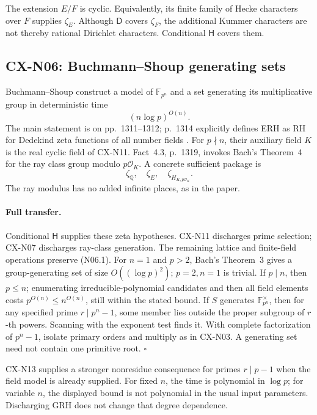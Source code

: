 The extension \(E/F\) is cyclic. Equivalently, its finite family of
Hecke characters over \(F\) supplies \(\zeta_E\). Although \(\mathsf D\)
covers \(\zeta_F\), the additional Kummer characters are not thereby
rational Dirichlet characters. Conditional \(\mathsf H\) covers them.

\subsection{CX-N06: Buchmann--Shoup generating sets}
\label{cx-n06}

Buchmann--Shoup construct a model of \(\mathbb F_{p^n}\) and a set
generating its multiplicative group in deterministic time
\[
                              (n\log p)^{O(n)}.                \tag{N06.1}
\]
The main statement is on pp.~1311--1312; p.~1314 explicitly defines
ERH as RH for Dedekind zeta functions of all number fields
\cite{CXNBuchmannShoup96}.
For \(p\nmid n\), their auxiliary field \(K\) is the real cyclic field of
CX-N11. Fact~4.3, p.~1319, invokes Bach's Theorem~4 for the ray class
group modulo \(p\mathcal O_K\). A concrete sufficient package is
\[
                   \zeta_{\mathbb Q},\quad\zeta_E,\quad
                   \zeta_{H_{K,p\mathcal O_K}} .
\]
The ray modulus has no added infinite places, as in the paper.

\paragraph{Full transfer.}
Conditional \(\mathsf H\) supplies these zeta hypotheses. CX-N11
discharges prime selection; CX-N07 discharges ray-class generation.
The remaining lattice and finite-field operations preserve (N06.1).
For \(n=1\) and \(p>2\), Bach's Theorem~3 gives a group-generating set of size \(O((\log p)^2)\); \(p=2,n=1\) is trivial. If \(p\mid n\), then \(p\leq n\); enumerating irreducible-polynomial candidates and then all field elements costs \(p^{O(n)}\leq n^{O(n)}\), still within the stated bound. If \(S\) generates \(\mathbb F_{p^n}^\times\), then
for any specified prime \(r\mid p^n-1\), some member lies outside the
proper subgroup of \(r\)-th powers. Scanning with the exponent test
finds it. With complete factorization of \(p^n-1\), isolate primary
orders and multiply as in CX-N03. A generating set need not contain
one primitive root. \(\square\)

CX-N13 supplies a stronger nonresidue consequence for primes \(r\mid p-1\)
when the field model is already supplied.
For fixed \(n\), the time is polynomial in \(\log p\); for variable
\(n\), the displayed bound is not polynomial in the usual input
parameters. Discharging GRH does not change that degree dependence.

